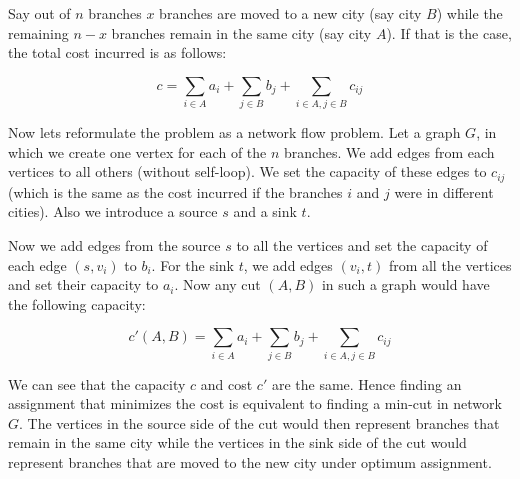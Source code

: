 Say out of $n$ branches $x$ branches are moved to a new city (say city $B$) while the remaining $n-x$ branches remain in the same city (say city $A$). If that is the case, the total cost incurred is as follows:

\[
  c = \sum\limits_{i \in A} a_i + \sum\limits_{j \in B} b_j + \sum\limits_{i \in A, j \in B} c_{ij}
\]

Now lets reformulate the problem as a network flow problem. Let a graph $G$, in which we create one vertex for each of the  $n$ branches. We add edges from each vertices to all others (without self-loop). We set the capacity of these edges to $c_{ij}$ (which is the same as the cost incurred if the branches $i$ and $j$ were in different cities). Also we introduce a source $s$ and a sink $t$.

Now we add edges from the source $s$ to all the vertices and set the capacity of each edge $(s, v_i)$ to $b_i$. For the sink $t$, we add edges $(v_i, t)$ from all the vertices and set their capacity to $a_i$. Now any cut $(A, B)$ in such a graph would have the following capacity:

\[
  c'(A, B) = \sum\limits_{i \in A} a_i + \sum\limits_{j \in B} b_j + \sum\limits_{i \in A, j \in B} c_{ij}
\]

We can see that the capacity $c$ and cost $c'$ are the same. Hence finding an assignment that minimizes the cost is equivalent to finding a min-cut in network $G$. The vertices in the source side of the cut would then represent branches that remain in the same city while the vertices in the sink side of the cut would represent branches that are moved to the new city under optimum assignment.
